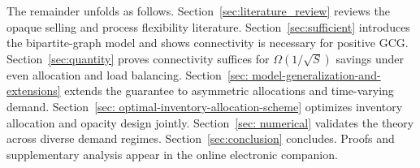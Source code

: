 The remainder unfolds as follows.
Section~\ref{sec:literature_review} reviews the opaque selling and process flexibility literature.
Section~\ref{sec:sufficient} introduces the bipartite-graph model and shows connectivity is necessary for positive GCG.
Section~\ref{sec:quantity} proves connectivity suffices for $\Omega(1/\sqrt{S})$ savings under even allocation and load balancing.
Section~\ref{sec: model-generalization-and-extensions} extends the guarantee to asymmetric allocations and time-varying demand.
Section~\ref{sec: optimal-inventory-allocation-scheme} optimizes inventory allocation and opacity design jointly.
Section~\ref{sec: numerical} validates the theory across diverse demand regimes.
Section~\ref{sec:conclusion} concludes.
Proofs and supplementary analysis appear in the online electronic companion.

%
%
